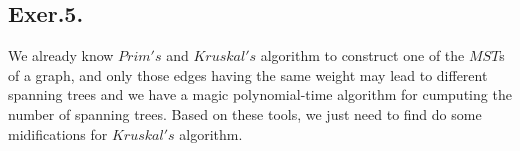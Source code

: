 \documentclass[UTF8]{ctexart}
\begin{document}
    \begin{figure}[h]
        \centering
    \end{figure}

\subsection*{Exer.5.}
    
    We already know $Prim's$ and $Kruskal's$ algorithm to construct one of the $MST$s of a graph, and 
    only those edges having the same weight may lead to different spanning trees and we have 
    a magic polynomial-time algorithm for cumputing the number of spanning trees.
    Based on these tools, we just need to find do some midifications for $Kruskal's$ algorithm.
\end{document}
